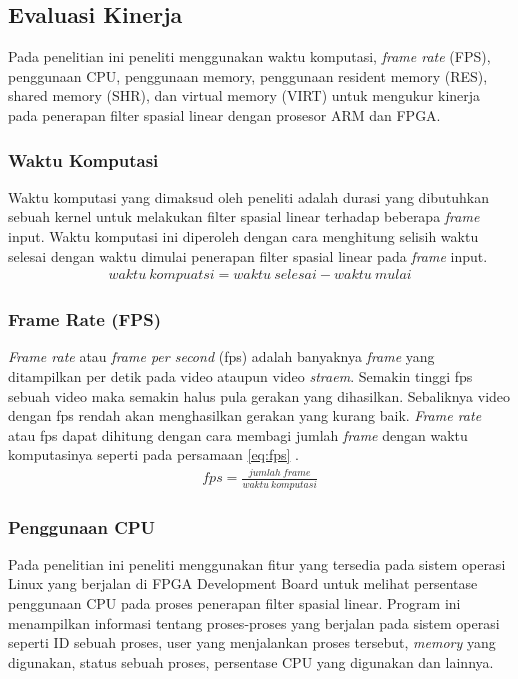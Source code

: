 \subsection{Evaluasi Kinerja}
Pada penelitian ini peneliti menggunakan waktu komputasi, \textit{frame rate} (FPS), penggunaan CPU, penggunaan {memory}, penggunaan {resident memory} (RES), {shared memory} (SHR), dan {virtual memory} (VIRT) untuk mengukur kinerja pada penerapan filter spasial linear dengan prosesor ARM dan FPGA.

\subsubsection{Waktu Komputasi}
Waktu komputasi yang dimaksud oleh peneliti adalah durasi yang dibutuhkan sebuah kernel untuk melakukan filter spasial linear terhadap beberapa \textit{frame} input. Waktu komputasi ini diperoleh dengan cara menghitung selisih waktu selesai dengan waktu dimulai penerapan filter spasial linear pada \textit{frame} input.
\begin{equation}
    \label{eq:time}
    \begin{split}
waktu\ kompuatsi = waktu\ selesai - waktu\ mulai
    \end{split}
\end{equation}

\subsubsection{Frame Rate (FPS)}
\textit{Frame rate} atau \textit{frame per second} (fps) adalah banyaknya \textit{frame} yang ditampilkan per detik pada video ataupun video \textit{straem}. Semakin tinggi fps sebuah video maka semakin halus pula gerakan yang dihasilkan. Sebaliknya video dengan fps rendah akan menghasilkan gerakan yang kurang baik. \textit{Frame rate} atau fps dapat dihitung dengan cara membagi jumlah \textit{frame} dengan waktu komputasinya seperti pada persamaan \ref{eq:fps} \cite{pdf:pavan}.
\begin{equation}
    \label{eq:fps}
    \begin{split}
fps = \frac{jumlah\ frame}{waktu\ komputasi}
    \end{split}
\end{equation}

\subsubsection{Penggunaan CPU}
Pada penelitian ini peneliti menggunakan fitur yang tersedia pada sistem operasi Linux yang berjalan di FPGA Development Board untuk melihat persentase penggunaan CPU pada proses penerapan filter spasial linear. Program ini menampilkan informasi tentang proses-proses yang berjalan pada sistem operasi seperti ID sebuah proses, user yang menjalankan proses tersebut, \textit{memory} yang digunakan, status sebuah proses, persentase CPU yang digunakan dan lainnya.

